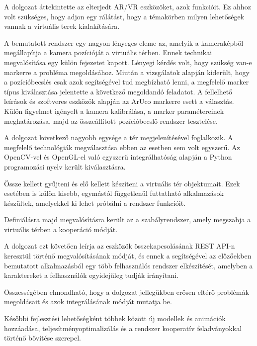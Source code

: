 
A dolgozat áttekintette az elterjedt AR/VR eszközöket, azok funkcióit. Ez ahhoz volt szükséges, hogy adjon egy rálátást, hogy a témakörben milyen lehetőségek vannak a virtuális terek kialakítására.

A bemutatott rendszer egy nagyon lényeges eleme az, amelyik a kameraképből megállapítja a kamera pozícióját a virtuális térben. Ennek technikai megvalósítása egy külön fejezetet kapott. Lényegi kérdés volt, hogy szükség van-e markerre a probléma megoldásához. Miután a vizsgálatok alapján kiderült, hogy a pozícióbecslés csak azok segítségével tud megbízható lenni, a megfelelő marker típus kiválasztása jelentette a következő megoldandó feladatot. A fellelhető leírások és szoftveres eszközök alapján az ArUco markerre esett a választás.
Külön figyelmet igényelt a kamera kalibrálása, a marker paramétereinek meghatározása, majd az összeállított pozícióbecslő rendszer tesztelése.

A dolgozat következő nagyobb egysége a tér megjelenítésével foglalkozik.
A megfelelő technológiák megválasztása ebben az esetben sem volt egyszerű.
Az OpenCV-vel és OpenGL-el való egyszerű integrálhatóság alapján a Python programozási nyelv került kiválasztásra.

Össze kellett gyűjteni és elő kellett készíteni a virtuális tér objektumait.
Ezek esetében is külön kisebb, egymástól függetlenül futtatható alkalmazások készültek, amelyekkel ki lehet próbálni a rendszer funkcióit.

Definiálásra majd megvalósításra került az a szabályrendszer, amely megszabja a virtuális térben a kooperáció módját.

A dolgozat ezt követően leírja az eszközök összekapcsolásának REST API-n keresztül történő megvalósításának módját, és ennek a segítségével az előzőekben bemutatott alkalmazásból egy több felhasználós rendszer elkészítését, amelyben a karaktereket a felhasználók egyidejűleg tudják irányítani.

Összességében elmondható, hogy a dolgozat jellegükben erősen eltérő problémák megoldásait és azok integrálásának módját mutatja be.

Későbbi fejlesztési lehetőségként többek között új modellek és animációk hozzáadása, teljesítményoptimalizálás és a rendszer kooperatív feladványokkal történő bővítése szerepel.
